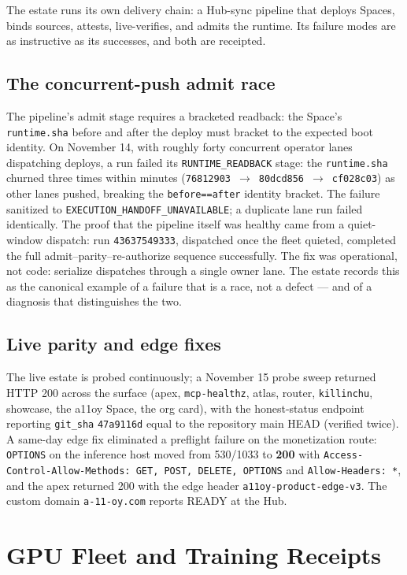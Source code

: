 ﻿\documentclass[11pt]{article}
\begin{document}
The estate runs its own delivery chain: a Hub-sync pipeline that deploys Spaces, binds sources, attests, live-verifies, and admits the runtime. Its failure modes are as instructive as its successes, and both are receipted.

\subsection{The concurrent-push admit race}
The pipeline's admit stage requires a bracketed readback: the Space's \texttt{runtime.sha} before and after the deploy must bracket to the expected boot identity. On November 14, with roughly forty concurrent operator lanes dispatching deploys, a run failed its \texttt{RUNTIME\_READBACK} stage: the \texttt{runtime.sha} churned three times within minutes (\texttt{76812903}~$\to$~\texttt{80dcd856}~$\to$~\texttt{cf028c03}) as other lanes pushed, breaking the \texttt{before==after} identity bracket. The failure sanitized to \texttt{EXECUTION\_HANDOFF\_UNAVAILABLE}; a duplicate lane run failed identically. The proof that the pipeline itself was healthy came from a quiet-window dispatch: run \texttt{43637549333}, dispatched once the fleet quieted, completed the full admit--parity--re-authorize sequence successfully. The fix was operational, not code: serialize dispatches through a single owner lane. The estate records this as the canonical example of a failure that is a race, not a defect --- and of a diagnosis that distinguishes the two.

\subsection{Live parity and edge fixes}
The live estate is probed continuously; a November 15 probe sweep returned HTTP 200 across the surface (apex, \texttt{mcp-healthz}, atlas, router, \texttt{killinchu}, showcase, the a11oy Space, the org card), with the honest-status endpoint reporting \texttt{git\_sha} \texttt{47a9116d} equal to the repository main HEAD (verified twice). A same-day edge fix eliminated a preflight failure on the monetization route: \texttt{OPTIONS} on the inference host moved from 530/1033 to \textbf{200} with \texttt{Access-Control-Allow-Methods: GET, POST, DELETE, OPTIONS} and \texttt{Allow-Headers: *}, and the apex returned 200 with the edge header \texttt{a11oy-product-edge-v3}. The custom domain \texttt{a-11-oy.com} reports READY at the Hub.

\section{GPU Fleet and Training Receipts}
\label{sec:fleet}
\end{document}
